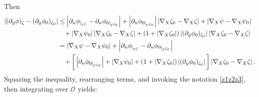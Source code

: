 \documentclass[11pt]{article}
\begin{document}
Then
\begin{equation*}
	\begin{split}
		\left| (\partial_y\phi)_{\zeta}-(\partial_y\phi_0)_{\zeta_0}\right|&\leq \left| \partial_n\phi_{|_{\Gamma^{\zeta       }}}-\partial_n\phi_{0|_{\Gamma^{\zeta_0       }}} \right|+\left| \partial_n\phi_{0|_{\Gamma^{\zeta_0       }}} \right|\left|  \nabla_X\zeta_0-\nabla_X\zeta\right|+ \left| \nabla_X\psi-\nabla_X\psi_0 \right|\\
		&\hspace{0.3cm}+ \left|\nabla_X\psi_0  \right|\left|\nabla_X\zeta_0-\nabla_X\zeta  \right|+(1+\left|\nabla_X\zeta_0  \right|)\left|(\partial_y\phi_0)_{\zeta_0}  \right| \left| \nabla_X\zeta_0-\nabla_X\zeta \right|\\
		&= \left| \nabla_X\psi-\nabla_X\psi_0 \right|+ \left| \partial_n\phi_{|_{\Gamma^{\zeta    }   }}-\partial_n\phi_{0|_{\Gamma^{\zeta_0     }  }} \right|\\
		&\hspace{0.3cm}+\bigg[  \left| \partial_n\phi_{0|_{\Gamma^{\zeta_0       }}} \right|+ \left|\nabla_X\psi_0  \right|+(1+\left|\nabla_X\zeta_0  \right|)\left|(\partial_y\phi_0)_{\zeta_0}  \right|\bigg]  \left| \nabla_X\zeta_0-\nabla_X\zeta \right|.
	\end{split}
\end{equation*}
Squaring the inequality, rearranging terms, and  invoking the notation \eqref{z1z2z3}, then integrating over $\mathcal{O}$ yields:
\end{document}

